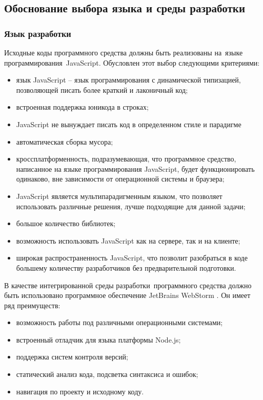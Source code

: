 \subsection{Обоснование выбора языка и среды разработки} %
\label{sub:domain:existing_language}

\subsubsection{Язык разработки}

Исходные коды программного средства должны быть реализованы на языке программирования JavaScript. Обусловлен этот выбор следующими критериями:

\begin{itemize}
  \item язык JavaScript -- язык программирования с динамической типизацией, позволяющей писать более краткий и лаконичный код;
  \item встроенная поддержка юникода в строках;
  \item JavaScript не вынуждает писать код в определенном стиле и парадигме
  \item автоматическая сборка мусора;
  \item кроссплатформенность, подразумевающая, что программное средство, написанное на языке программирования JavaScript, будет функционировать одинаково, вне зависимости от операционной системы и браузера;
  \item JavaScript является мультипарадигменным языком, что позволяет использовать различные решения, лучше подходящие для данной задачи;
  \item большое количество библиотек;
  \item возможность использовать JavaScript как на сервере, так и на клиенте;
  \item широкая распространенность JavaScript, что позволит разобраться в коде большему количеству разработчиков без предварительной подготовки.
\end{itemize}

В качестве интегрированной среды разработки программного средства должно быть использовано программное обеспечение JetBrains WebStorm \cite{webstorm}. Он имеет ряд преимуществ:
\begin{itemize}
  \item возможность работы под различными операционными системами;
  \item встроенный отладчик для языка платформы Node.js;
  \item поддержка систем контроля версий;
  \item статический анализ кода, подсветка синтаксиса и ошибок;
  \item навигация по проекту и исходному коду.
\end{itemize}

